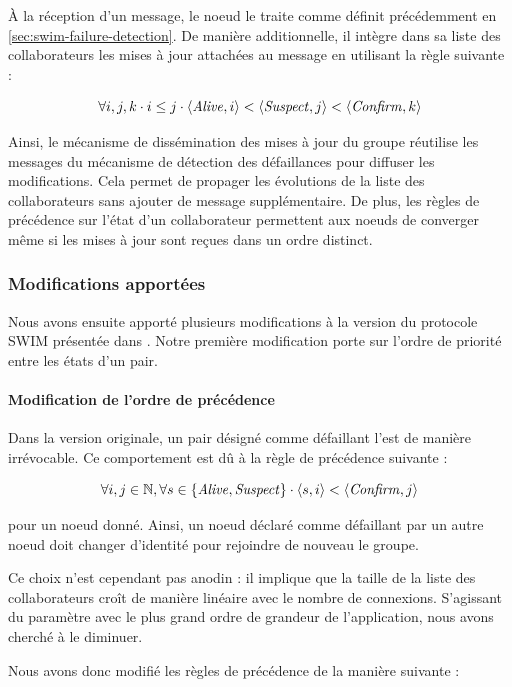 À la réception d'un message, le noeud le traite comme définit précédemment en \autoref{sec:swim-failure-detection}.
De manière additionnelle, il intègre dans sa liste des collaborateurs les mises à jour attachées au message en utilisant la règle suivante :

\[\forall i,j,k \cdot i \leq j \cdot \langle \mathit{Alive},i \rangle < \langle \mathit{Suspect},j \rangle < \langle \mathit{Confirm},k \rangle \]

Ainsi, le mécanisme de dissémination des mises à jour du groupe réutilise les messages du mécanisme de détection des défaillances pour diffuser les modifications.
Cela permet de propager les évolutions de la liste des collaborateurs sans ajouter de message supplémentaire.
De plus, les règles de précédence sur l'état d'un collaborateur permettent aux noeuds de converger même si les mises à jour sont reçues dans un ordre distinct.

\subsubsection{Modifications apportées}

Nous avons ensuite apporté plusieurs modifications à la version du protocole SWIM présentée dans \cite{swim2002}.
Notre première modification porte sur l'ordre de priorité entre les états d'un pair.

\paragraph{Modification de l'ordre de précédence}

Dans la version originale, un pair désigné comme défaillant l'est de manière irrévocable.
Ce comportement est dû à la règle de précédence suivante :

\[\forall i,j \in \mathbb{N}, \forall s \in \{\mathit{Alive}, \mathit{Suspect}\} \cdot \langle s,i \rangle < \langle \mathit{Confirm},j \rangle\]

pour un noeud donné.
Ainsi, un noeud déclaré comme défaillant par un autre noeud doit changer d'identité pour rejoindre de nouveau le groupe.

Ce choix n'est cependant pas anodin : il implique que la taille de la liste des collaborateurs croît de manière linéaire avec le nombre de connexions.
S'agissant du paramètre avec le plus grand ordre de grandeur de l'application, nous avons cherché à le diminuer.

Nous avons donc modifié les règles de précédence de la manière suivante :

